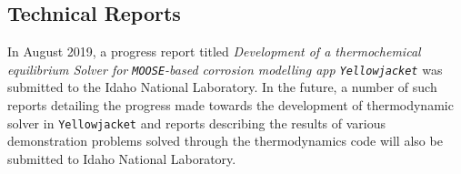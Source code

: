 	\subsection{Technical Reports}
	In August 2019, a progress report titled \emph{Development of a thermochemical equilibrium Solver for \texttt{MOOSE}-based corrosion modelling app  \texttt{Yellowjacket}} was submitted to the Idaho National Laboratory. In the future, a number of such reports detailing the progress made towards the development of thermodynamic solver in \texttt{Yellowjacket} and reports describing the results of various demonstration problems solved through the thermodynamics code will also be submitted to Idaho National Laboratory. 
	
	
	
	